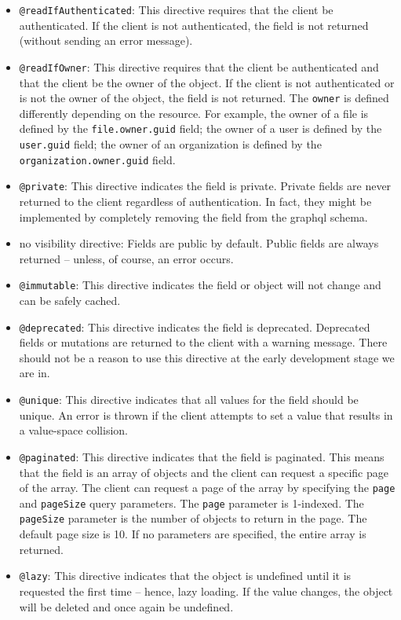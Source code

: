 \begin{itemize}
\tightlist
\item
  \texttt{@readIfAuthenticated}: This directive requires that the client
  be authenticated. If the client is not authenticated, the field is not
  returned (without sending an error message).
\item
  \texttt{@readIfOwner}: This directive requires that the client be
  authenticated and that the client be the owner of the object. If the
  client is not authenticated or is not the owner of the object, the
  field is not returned. The \texttt{owner} is defined differently
  depending on the resource. For example, the owner of a file is defined
  by the \texttt{file.owner.guid} field; the owner of a user is defined
  by the \texttt{user.guid} field; the owner of an organization is
  defined by the \texttt{organization.owner.guid} field.
\item
  \texttt{@private}: This directive indicates the field is private.
  Private fields are never returned to the client regardless of
  authentication. In fact, they might be implemented by completely
  removing the field from the graphql schema.
\item
  no visibility directive: Fields are public by default. Public fields
  are always returned -- unless, of course, an error occurs.
\item
  \texttt{@immutable}: This directive indicates the field or object will
  not change and can be safely cached.
\item
  \texttt{@deprecated}: This directive indicates the field is
  deprecated. Deprecated fields or mutations are returned to the client
  with a warning message. There should not be a reason to use this
  directive at the early development stage we are in.
\item
  \texttt{@unique}: This directive indicates that all values for the
  field should be unique. An error is thrown if the client attempts to
  set a value that results in a value-space collision.
\item
  \texttt{@paginated}: This directive indicates that the field is
  paginated. This means that the field is an array of objects and the
  client can request a specific page of the array. The client can
  request a page of the array by specifying the \texttt{page} and
  \texttt{pageSize} query parameters. The \texttt{page} parameter is
  1-indexed. The \texttt{pageSize} parameter is the number of objects to
  return in the page. The default page size is 10. If no parameters are
  specified, the entire array is returned.
\item
  \texttt{@lazy}: This directive indicates that the object is undefined
  until it is requested the first time -- hence, lazy loading. If the
  value changes, the object will be deleted and once again be undefined.
\end{itemize}


